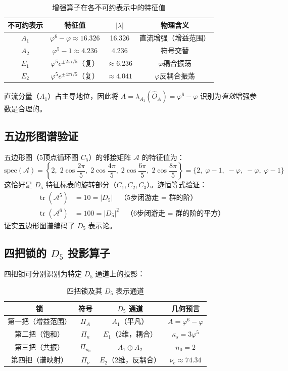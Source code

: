 \documentclass[12pt,a4paper,twocolumn]{article}
\renewcommand{\phi}{\varphi}
\begin{document}
\begin{table}[H]
\centering
\caption{增强算子在各不可约表示中的特征值}
\label{tab:eigenvalues_cn}
\begin{tabular}{c|c|c|c}
\hline
不可约表示 & 特征值 & $|\lambda|$ & 物理含义 \\
\hline
$A_1$ & $\phi^6 - \phi \approx 16.326$ & 16.326 & 直流增强（增益范围） \\
$A_2$ & $\phi^5 - 1 \approx 4.236$ & 4.236 & 符号交替 \\
$E_1$ & $\phi^5 e^{\pm 2\pi i/5}$（复） & $\approx 6.236$ & $\phi$耦合振荡 \\
$E_2$ & $\phi^5 e^{\pm 4\pi i/5}$（复） & $\approx 4.041$ & $\phi$反耦合振荡 \\
\hline
\end{tabular}
\end{table}

直流分量（$A_1$）占主导地位，因此将 $A = \lambda_{A_1}(\hat{O}_A) = \phi^6 - \phi$ 识别为\emph{有效}增强参数是合理的。

\subsection{五边形图谱验证}
五边形图（5顶点循环图 $C_5$）的邻接矩阵 $\mathcal{A}$ 的特征值为：
\[
\mathrm{spec}(\mathcal{A}) = \left\{2,\; 2\cos\frac{2\pi}{5},\; 2\cos\frac{4\pi}{5},\; 2\cos\frac{6\pi}{5},\; 2\cos\frac{8\pi}{5}\right\}
= \{2, \;\phi-1, \;-\phi, \;-\phi, \;\phi-1\}
\]
这恰好是 $D_5$ 特征标表的旋转部分（$C_1, C_2, C_3$）。迹恒等式验证：
\begin{align}
\operatorname{tr}(\mathcal{A}^5) &= 10 = |D_5| \quad \text{（5步闭游走 = 群的阶）} \\
\operatorname{tr}(\mathcal{A}^6) &= 100 = |D_5|^2 \quad \text{（6步闭游走 = 群的阶的平方）}
\end{align}
证实五边形图谱编码了 $D_5$ 表示论。

\subsection{四把锁的 $D_5$ 投影算子}
四把锁可分别识别为特定 $D_5$ 通道上的投影：

\begin{table}[H]
\centering
\caption{四把锁及其 $D_5$ 表示通道}
\label{tab:four_locks_d5_cn}
\begin{tabular}{c|c|c|c}
\hline
锁 & 符号 & $D_5$ 通道 & 几何预言 \\
\hline
第一把（增益范围） & $\Pi_A$ & $A_1$（平凡） & $A = \phi^6 - \phi$ \\
第二把（饱和） & $\Pi_\kappa$ & $E_1$（2维，耦合） & $\kappa_s = 3\phi^5$ \\
第三把（共振） & $\Pi_{n_0}$ & $A_1 \oplus A_2$ & $n_0 = 2$ \\
第四把（谱映射） & $\Pi_\nu$ & $E_2$（2维，反耦合） & $\nu_e \approx 74.34$ \\
\hline
\end{tabular}
\end{table}
\end{document}

